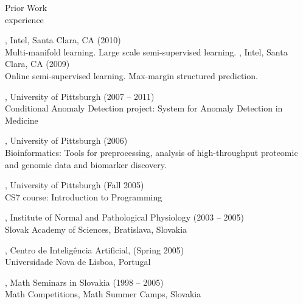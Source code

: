 \documentclass{resume}
\begin{document}
\begin{category}{Prior Work \\experience}

, Intel, Santa Clara, CA (2010) \\
Multi-manifold learning. Large scale semi-supervised learning.
, Intel, Santa Clara, CA (2009)\\
Online semi-supervised learning. Max-margin structured prediction.

, University of Pittsburgh (2007 -- 2011)\\
Conditional Anomaly Detection project: System for Anomaly Detection in Medicine

, University of Pittsburgh (2006)\\
Bioinformatics: Tools for preprocessing, analysis of high-throughput proteomic and genomic data and biomarker discovery.

, University of Pittsburgh (Fall 2005)\\ 
CS7 course: Introduction to Programming 

, Institute of Normal and Pathological Physiology (2003 -- 2005)\\
Slovak Academy of Sciences, Bratislava, Slovakia

, Centro de Intelig\^encia Artificial, (Spring 2005)\\
Universidade Nova de Lisboa, Portugal

, Math Seminars in Slovakia (1998 -- 2005)\\ 
Math Competitions, Math Summer Camps, Slovakia

%
%
\end{category}

\end{document}
